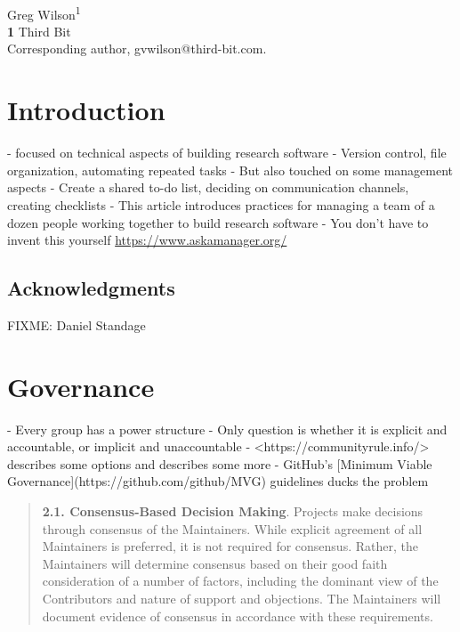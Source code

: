 \documentclass[10pt,letterpaper]{article}
\begin{document}
\vspace*{0.2in}

\begin{flushleft}
{\Large
\textbf{}
}
\newline
\\
{Greg Wilson}\textsuperscript{1{\ddag}}
\\
\bigskip
\textbf{1} Third Bit\\
{\ddag} Corresponding author, gvwilson@third-bit.com.
\end{flushleft}

\section*{Introduction}

- \cite{Wilson2014,Wilson2017} focused on technical aspects of building research software
  - Version control, file organization, automating repeated tasks
- But also touched on some management aspects
  - Create a shared to-do list, deciding on communication channels, creating checklists
- This article introduces practices for managing a team of a dozen people working together to build research software
- You don't have to invent this yourself \url{https://www.askamanager.org/}

\subsection*{Acknowledgments}

FIXME: Daniel Standage

\section{Governance}

- Every group has a power structure
  - Only question is whether it is explicit and accountable, or implicit and unaccountable \cite{Freeman1972}
- <https://communityrule.info/> describes some options and \cite{Fogel2021} describes some more
- GitHub's [Minimum Viable Governance](https://github.com/github/MVG) guidelines ducks the problem

\begin{quotation}
  \textbf{2.1. Consensus-Based Decision Making}.
  Projects make decisions through consensus of the Maintainers.
  While explicit agreement of all Maintainers is preferred, it is not required for consensus.
  Rather, the Maintainers will determine consensus based on their good faith consideration of a number of factors,
  including the dominant view of the Contributors and nature of support and objections.
  The Maintainers will document evidence of consensus in accordance with these requirements.
\end{quotation}
\end{document}
